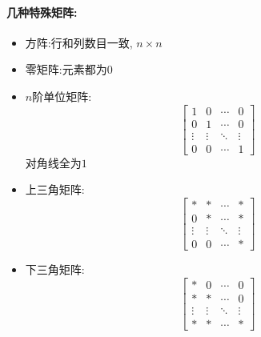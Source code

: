 \paragraph{几种特殊矩阵:}
\begin{itemize}
    \item 方阵:行和列数目一致, $n \times n$
    \item 零矩阵:元素都为$0$
    
    \item $n$阶单位矩阵: \begin{equation}
        \begin{bmatrix}1&0&\cdots&0\\0&1&\cdots&0\\\vdots&\vdots&\ddots&\vdots\\0&0&\cdots&1\end{bmatrix}
      \end{equation}
      对角线全为$1$

    \item 上三角矩阵:
    \begin{equation}
      \begin{bmatrix}*&*&\cdots&*\\0&*&\cdots&*\\\vdots&\vdots&\ddots&\vdots\\0&0&\cdots&*\end{bmatrix}
    \end{equation}

    \item 下三角矩阵:
    \begin{equation}
      \begin{bmatrix}*&0&\cdots&0\\ *&*&\cdots&0\\\vdots&\vdots&\ddots&\vdots\\ *&*&\cdots&*\end{bmatrix}
    \end{equation}
\end{itemize}

